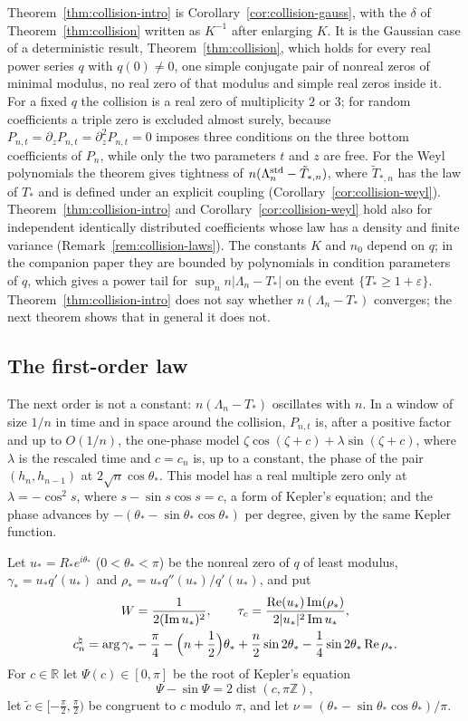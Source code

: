 \documentclass[11pt]{amsart}
\theoremstyle{definition}
\theoremstyle{remark}
\numberwithin{equation}{section}
\newcommand{\R}{\mathbb{R}}
\newcommand{\Z}{\mathbb{Z}}
\newcommand{\eps}{\varepsilon}
\DeclareMathOperator{\re}{Re}
\DeclareMathOperator{\im}{Im}
\DeclareMathOperator{\dist}{dist}
\begin{document}
Theorem~\ref{thm:collision-intro} is Corollary~\ref{cor:collision-gauss}, with the $\delta$ of Theorem~\ref{thm:collision} written as $K^{-1}$ after enlarging $K$. It is the Gaussian case of a deterministic result, Theorem~\ref{thm:collision}, which holds for every real power series $q$ with $q(0)\ne0$, one simple conjugate pair of nonreal zeros of minimal modulus, no real zero of that modulus and simple real zeros inside it. For a fixed $q$ the collision is a real zero of multiplicity $2$ or $3$; for random coefficients a triple zero is excluded almost surely, because $P_{n,t}=\partial_zP_{n,t}=\partial_z^2P_{n,t}=0$ imposes three conditions on the three bottom coefficients of $P_n$, while only the two parameters $t$ and $z$ are free. For the Weyl polynomials the theorem gives tightness of $n(\Lambda_n^{\rm std}-\tilde T_{*,n})$, where $\tilde T_{*,n}$ has the law of $T_*$ and is defined under an explicit coupling (Corollary~\ref{cor:collision-weyl}). Theorem~\ref{thm:collision-intro} and Corollary~\ref{cor:collision-weyl} hold also for independent identically distributed coefficients whose law has a density and finite variance (Remark~\ref{rem:collision-laws}). The constants $K$ and $n_0$ depend on $q$; in the companion paper \cite{CompA} they are bounded by polynomials in condition parameters of $q$, which gives a power tail for $\sup_nn|\Lambda_n-T_*|$ on the event $\{T_*\ge1+\eps\}$. Theorem~\ref{thm:collision-intro} does not say whether $n(\Lambda_n-T_*)$ converges; the next theorem shows that in general it does not.

\subsection{The first-order law}\label{sec:intro-firstorder}
The next order is not a constant: $n(\Lambda_n-T_*)$ oscillates with $n$. In a window of size $1/n$ in time and in space around the collision, $P_{n,t}$ is, after a positive factor and up to $O(1/n)$, the one-phase model $\zeta\cos(\zeta+c)+\lambda\sin(\zeta+c)$, where $\lambda$ is the rescaled time and $c=c_n$ is, up to a constant, the phase of the pair $(h_n,h_{n-1})$ at $2\sqrt n\cos\theta_*$. This model has a real multiple zero only at $\lambda=-\cos^2s$, where $s-\sin s\cos s=c$, a form of Kepler's equation; and the phase advances by $-(\theta_*-\sin\theta_*\cos\theta_*)$ per degree, given by the same Kepler function.

Let $u_*=R_*e^{i\theta_*}$ ($0<\theta_*<\pi$) be the nonreal zero of $q$ of least modulus, $\gamma_*=u_*q'(u_*)$ and $\rho_*=u_*q''(u_*)/q'(u_*)$, and put
\begin{gather*}
W=\frac1{2(\im u_*)^2},\qquad\tau_c=\frac{\re(u_*)\im(\rho_*)}{2|u_*|^2\im u_*},\\
c_n^\natural=\arg\gamma_*-\frac\pi4-\Bigl(n+\frac12\Bigr)\theta_*+\frac n2\sin2\theta_*-\frac14\sin2\theta_*\re\rho_* .
\end{gather*}
For $c\in\R$ let $\Psi(c)\in[0,\pi]$ be the root of Kepler's equation
\begin{equation}\label{eq:kepler-intro}
\Psi-\sin\Psi=2\dist(c,\pi\Z),
\end{equation}
let $\tilde c\in[-\frac\pi2,\frac\pi2)$ be congruent to $c$ modulo $\pi$, and let $\nu=(\theta_*-\sin\theta_*\cos\theta_*)/\pi$.
\end{document}
